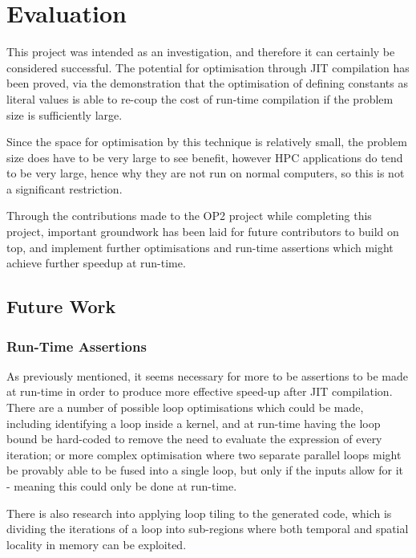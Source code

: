 
\section{Evaluation}
\label{s:eval}

This project was intended as an investigation, and therefore it can certainly be considered successful. The potential for optimisation through JIT compilation has been proved, via the demonstration that the optimisation of defining constants as literal values is able to re-coup the cost of run-time compilation if the problem size is sufficiently large.
\par
Since the space for optimisation by this technique is relatively small, the problem size does have to be very large to see benefit, however HPC applications do tend to be very large, hence why they are not run on normal computers, so this is not a significant restriction.
\par
Through the contributions made to the OP2 project while completing this project, important groundwork has been laid for future contributors to build on top, and implement further optimisations and run-time assertions which might achieve further speedup at run-time.

\subsection{Future Work}
\label{ss:fw}

\subsubsection{Run-Time Assertions}
As previously mentioned, it seems necessary for more to be assertions to be made at run-time in order to produce more effective speed-up after JIT compilation. There are a number of possible loop optimisations which could be made, including identifying a loop inside a kernel, and at run-time having the loop bound be hard-coded to remove the need to evaluate the expression of every iteration; or more complex optimisation where two separate parallel loops might be provably able to be fused into a single loop, but only if the inputs allow for it - meaning this could only be done at run-time. \clearpage

\noindent There is also research into applying loop tiling to the generated code, which is dividing the iterations of a loop into sub-regions where both temporal and spatial locality in memory can be exploited. \par

